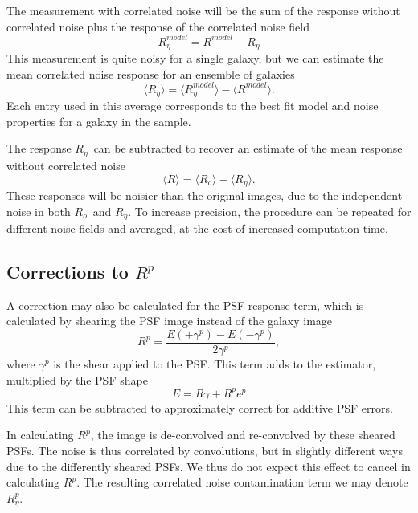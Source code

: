 \documentclass[usegraphicx,usenatbib]{mn2e}
\newcommand{\mcalR}{$R$}
\newcommand{\mcalRpsf}{$R^{p}$}
\newcommand{\mcalRpsfnoise}{$R^{p}_\eta$}
\newcommand{\mcalRo}{$R_o$}
\newcommand{\mcalRnoise}{$R_\eta$}
\newcommand{\mcalRmodel}{$R^{model}$}
\newcommand{\mcalRnoisemodel}{$R^{model}_\eta$}
\begin{document}
The measurement with correlated noise will be the sum of the response
without correlated noise plus the response of the correlated noise field
\begin{equation}
    \mbox{\mcalRnoisemodel} = \mbox{\mcalRmodel} + \mbox{\mcalRnoise}
\end{equation}
This measurement is quite noisy for a single galaxy, but we
can estimate the mean correlated noise response for an ensemble
of galaxies
\begin{equation}
    \langle \mbox{\mcalRnoise} \rangle = \langle \mbox{\mcalRnoisemodel} \rangle - \langle \mbox{\mcalRmodel} \rangle.
\end{equation}
Each entry used in this average corresponds to the best fit model
and noise properties for a galaxy in the sample.

The response \mcalRnoise\ can be subtracted to recover an estimate of the mean
response without correlated noise
\begin{equation}
    \langle \mbox{\mcalR} \rangle = \langle \mbox{\mcalRo} \rangle - \langle \mbox{\mcalRnoise} \rangle.
\end{equation}
These responses will be noisier than the original images, due to the
independent noise in both \mcalRo\ and \mcalRnoise.  To increase
precision, the procedure can be repeated for different noise fields
and averaged, at the cost of increased computation time.

\subsection{Corrections to \mcalRpsf}

A correction may also be calculated for the PSF response term, which is
calculated by shearing the PSF image instead of the galaxy image \citep{HuffMcal}
\begin{equation}
    \mbox{\mcalRpsf} = \frac{E(+\gamma^{p}) - E(-\gamma^{p})}{2 \gamma^{p}},
\end{equation}
where $\gamma^{p}$ is the shear applied to the PSF.  This
term adds to the estimator, multiplied by the PSF shape
\begin{equation}
    E = \mbox{\mcalR} \gamma + \mbox{\mcalRpsf} e^{p} 
\end{equation}
This term can be subtracted to approximately correct for additive PSF errors.

In calculating \mcalRpsf, the image is de-convolved and re-convolved by these
sheared PSFs. The noise is thus correlated by convolutions, but in slightly
different ways due to the differently sheared PSFs.  We thus do not expect this
effect to cancel in calculating \mcalRpsf. The resulting correlated noise
contamination term we may denote \mcalRpsfnoise.
\end{document}
